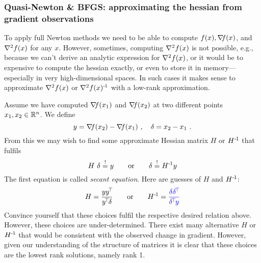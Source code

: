 \subsubsection{Quasi-Newton \& BFGS: approximating the hessian from gradient observations}

To apply full Newton methods we need to be able to compute $f(x), {\nabla_{\!\!}}
f(x)$, and ${\nabla_{\!\!}^2} f(x)$ for any $x$. However, sometimes, computing ${\nabla_{\!\!}^2} f(x)$ is not
possible, e.g., because we can't derive an analytic expression for
${\nabla_{\!\!}^2} f(x)$, or it would be to expensive to compute the hessian
exactly, or even to store it in memory---especially in very
high-dimensional spaces. In such cases it makes sense to approximate
${\nabla_{\!\!}^2} f(x)$ or ${\nabla_{\!\!}^2} f(x)^{{\hspace*{-.0pt}\text{\rm -}\hspace*{-.5pt}}1}$ with a low-rank approximation.

Assume we have computed ${\nabla_{\!\!}} f(x_1)$ and ${\nabla_{\!\!}} f(x_2)$ at two different
points $x_1,x_2\in{\mathbb{R}}^n$. We define
\begin{equation}
y={\nabla_{\!\!}} f(x_2) - {\nabla_{\!\!}} f(x_1) ~,\quad \delta=x_2-x_1 ~.
\end{equation}
From this we may wish to find some approximate Hessian matrix $H$ or  $H^{{\hspace*{-.0pt}\text{\rm -}\hspace*{-.5pt}}1}$ that
fulfils
\begin{equation}
H~ \delta \overset{!}= y \qquad\text{or}\qquad  \delta \overset{!}= H^{{\hspace*{-.0pt}\text{\rm -}\hspace*{-.5pt}}1} y
\end{equation}
The first equation is called \emph{secant equation}. Here are guesses of  $H$ and  $H^{{\hspace*{-.0pt}\text{\rm -}\hspace*{-.5pt}}1}$:
\begin{equation}
H = \frac{y y^\T}{y^\T \d} \qquad\text{or}\qquad H^\1 = {\color{blue}\frac{\d \d^\T}{\d^\T y}}
\end{equation}
Convince yourself that these choices fulfil the respective desired relation
above. However, these choices are under-determined. There exist many
alternative $H$ or $H^{{\hspace*{-.0pt}\text{\rm -}\hspace*{-.5pt}}1}$ that would be consistent with the observed
change in gradient. However, given our understanding of the structure
of matrices it is clear that these choices are the lowest rank
solutions, namely rank 1.

